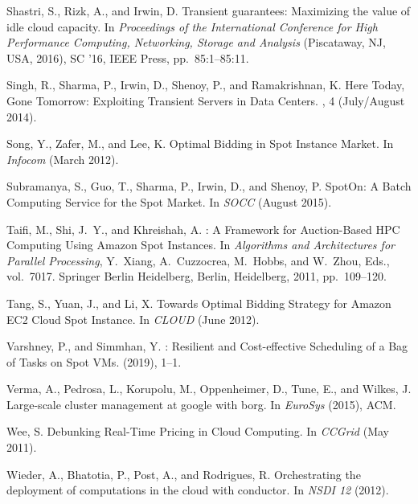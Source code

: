 \documentclass[sigconf]{acmart} %
\begin{document}
\begin{thebibliography}{10}
{\sc Shastri, S., Rizk, A., and Irwin, D.}
\newblock Transient guarantees: Maximizing the value of idle cloud capacity.
\newblock In {\em Proceedings of the International Conference for High
  Performance Computing, Networking, Storage and Analysis\/} (Piscataway, NJ,
  USA, 2016), SC '16, IEEE Press, pp.~85:1--85:11.

{\sc Singh, R., Sharma, P., Irwin, D., Shenoy, P., and Ramakrishnan, K.}
\newblock Here {T}oday, {G}one {T}omorrow: Exploiting {T}ransient {S}ervers in
  {D}ata {C}enters.
, 4 (July/August 2014).

{\sc Song, Y., Zafer, M., and Lee, K.}
\newblock Optimal {B}idding in {S}pot {I}nstance {M}arket.
\newblock In {\em Infocom\/} (March 2012).

{\sc Subramanya, S., Guo, T., Sharma, P., Irwin, D., and Shenoy, P.}
\newblock Spot{O}n: A {B}atch {C}omputing {S}ervice for the {S}pot {M}arket.
\newblock In {\em SOCC\/} (August 2015).

{\sc Taifi, M., Shi, J.~Y., and Khreishah, A.}
: {A} {Framework} for {Auction}-{Based} {HPC} {Computing}
  {Using} {Amazon} {Spot} {Instances}.
\newblock In {\em Algorithms and {Architectures} for {Parallel} {Processing}},
  Y.~Xiang, A.~Cuzzocrea, M.~Hobbs, and W.~Zhou, Eds., vol.~7017. Springer
  Berlin Heidelberg, Berlin, Heidelberg, 2011, pp.~109--120.

{\sc Tang, S., Yuan, J., and Li, X.}
\newblock Towards {O}ptimal {B}idding {S}trategy for {A}mazon {E}{C}2 {C}loud
  {S}pot {I}nstance.
\newblock In {\em CLOUD\/} (June 2012).

{\sc Varshney, P., and Simmhan, Y.}
 : {Resilient} and {Cost}-effective {Scheduling} of a {Bag}
  of {Tasks} on {Spot} {VMs}.
 (2019),
  1--1.

{\sc Verma, A., Pedrosa, L., Korupolu, M., Oppenheimer, D., Tune, E., and
  Wilkes, J.}
\newblock Large-scale cluster management at google with borg.
\newblock In {\em EuroSys\/} (2015), ACM.

{\sc Wee, S.}
\newblock Debunking {R}eal-{T}ime {P}ricing in {C}loud {C}omputing.
\newblock In {\em CCGrid\/} (May 2011).

{\sc Wieder, A., Bhatotia, P., Post, A., and Rodrigues, R.}
\newblock Orchestrating the deployment of computations in the cloud with
  conductor.
\newblock In {\em NSDI 12\/} (2012).


\end{thebibliography}
\end{document}
